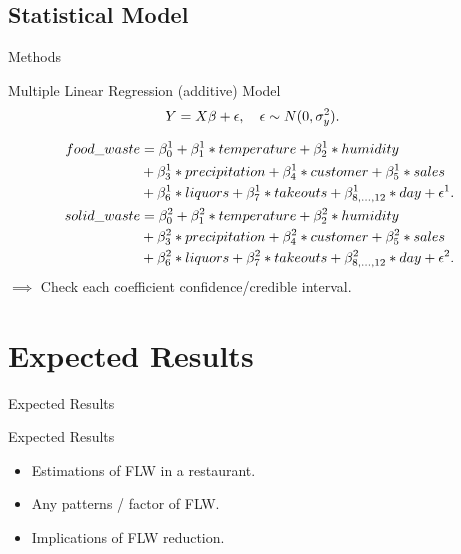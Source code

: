 \documentclass{beamer}\usepackage[]{graphicx}\usepackage[]{xcolor}
\begin{document}
\subsection{Statistical Model}
\begin{frame}{Methods}
    \small
    \begin{block}{Multiple Linear Regression (additive) Model}
        \[
        \begin{aligned}
            \small Y &=  X\beta + \epsilon, \hspace{1em}
            \epsilon \sim N(0, \sigma_y^2).
        \end{aligned}
        \]
    \end{block}
    \begin{align*}
        \small food\_waste 
        &= \beta_0^1 + \beta_1^1 * temperature + \beta_2^1 * humidity \\
        &+ \beta_3^1 * precipitation + \beta_4^1 * customer + \beta_5^1 * sales\\ 
        &+ \beta_6^1 * liquors + \beta_7^1 * takeouts 
        + \beta_{8,...,12}^1 * day + \epsilon^1.\\
        \small solid\_waste 
        &= \beta_0^2 + \beta_1^2 * temperature + \beta_2^2 * humidity \\
        &+ \beta_3^2 * precipitation + \beta_4^2 * customer + \beta_5^2 * sales\\ 
        &+ \beta_6^2 * liquors + \beta_7^2 * takeouts 
        + \beta_{8,...,12}^2 * day + \epsilon^2.
    \end{align*}
    \normalsize $\implies$ Check each coefficient confidence/credible interval.
\end{frame}

\section{Expected Results}
\begin{frame}{Expected Results}
    \begin{block}{Expected Results}
        \begin{itemize}
            \item Estimations of FLW in a restaurant.
            \item Any patterns / factor of FLW.
            \item Implications of FLW reduction.
        \end{itemize}
    \end{block}
\end{frame}
\end{document}

